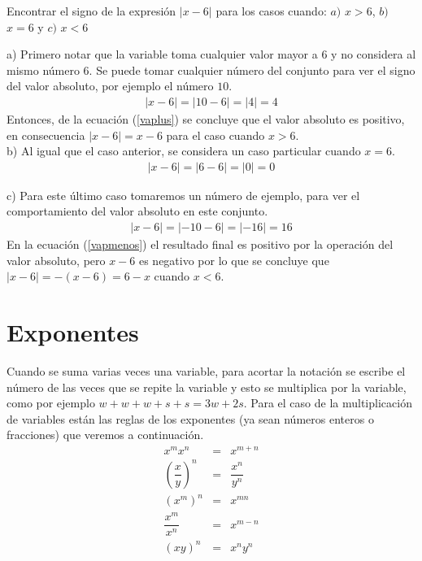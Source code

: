 \begin{myexample}
Encontrar el signo de la expresión $|x-6|$ para los casos cuando: $a)$ $x>6$, $b)$ $x=6$ y $c)$ $x<6$
\end{myexample}
\noindent a) Primero notar que la variable toma cualquier valor mayor a $6$ y no considera al mismo número $6$. Se puede tomar cualquier número del conjunto para ver el signo del valor absoluto, por ejemplo el número $10$.\\
\begin{eqnarray}
|x-6|=|10-6|=|4|=4 \label{vaplus}
\end{eqnarray}
Entonces, de la ecuación (\ref{vaplus}) se concluye que el valor absoluto es positivo, en consecuencia $|x-6|=x-6$ para el caso cuando $x>6$.\\

\noindent b) Al igual que el caso anterior, se considera un caso particular cuando $x=6$.
\begin{eqnarray}
|x-6|=|6-6|=|0|=0
\end{eqnarray}

\noindent c) Para este último caso tomaremos un número de ejemplo, para ver el comportamiento del valor absoluto en este conjunto.
\begin{eqnarray}
|x-6|=|-10-6|=|-16|=16  \label{vapmenos}
\end{eqnarray} 
En la ecuación (\ref{vapmenos}) el resultado final es positivo por la operación del valor absoluto, pero $x-6$ es negativo por lo que se concluye que $|x-6|=-(x-6)=6-x$ cuando $x<6$.

\section{Exponentes}
\label{exponentes}
Cuando se suma varias veces una variable, para acortar la notación se escribe el número de las veces que se repite la variable y esto se multiplica por la variable, como por ejemplo $w+w+w+s+s=3w+2s$. Para el caso de la multiplicación de variables están las reglas de los exponentes (ya sean números enteros o fracciones) que veremos a continuación.\\

\begin{eqnarray}
x^{m}x^{n}&=&x^{m+n}\\
\left(\dfrac{x}{y}\right)^{n}&=&\dfrac{x^{n}}{y^{n}}\\
(x^{m})^{n}&=&x^{mn}\\
\dfrac{x^{m}}{x^{n}}&=&x^{m-n}\\
(xy)^{n}&=&x^{n}y^{n}
\end{eqnarray}


